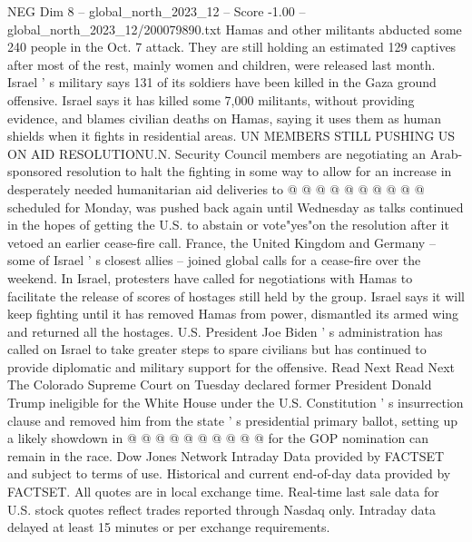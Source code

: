 \begin{textsample}{NEG Dim 8 – global\_north\_2023\_12 – Score -1.00 – global\_north\_2023\_12/200079890.txt}
Hamas and other militants abducted some 240 people in the Oct. 7 attack.
They are still holding an estimated 129 captives after most of the rest, mainly women and children, were released last month.
Israel ' s military says 131 of its soldiers have been killed in the Gaza ground offensive.
Israel says it has killed some 7,000 militants, without providing evidence, and blames civilian deaths on Hamas, saying it uses them as human shields when it fights in residential areas.
UN MEMBERS STILL PUSHING US ON AID RESOLUTIONU.N.
Security Council members are negotiating an Arab-sponsored resolution to halt the fighting in some way to allow for an increase in desperately needed humanitarian aid deliveries to @ @ @ @ @ @ @ @ @ @ scheduled for Monday, was pushed back again until Wednesday as talks continued in the hopes of getting the U.S. to abstain or vote"yes"on the resolution after it vetoed an earlier cease-fire call.
France, the United Kingdom and Germany -- some of Israel ' s closest allies -- joined global calls for a cease-fire over the weekend.
In Israel, protesters have called for negotiations with Hamas to facilitate the release of scores of hostages still held by the group.
Israel says it will keep fighting until it has removed Hamas from power, dismantled its armed wing and returned all the hostages.
U.S.
President Joe Biden ' s administration has called on Israel to take greater steps to spare civilians but has continued to provide diplomatic and military support for the offensive.
Read Next Read Next The Colorado Supreme Court on Tuesday declared former President Donald Trump ineligible for the White House under the U.S.
Constitution ' s insurrection clause and removed him from the state ' s presidential primary ballot, setting up a likely showdown in @ @ @ @ @ @ @ @ @ @ for the GOP nomination can remain in the race.
Dow Jones Network Intraday Data provided by FACTSET and subject to terms of use.
Historical and current end-of-day data provided by FACTSET.
All quotes are in local exchange time.
Real-time last sale data for U.S. stock quotes reflect trades reported through Nasdaq only.
Intraday data delayed at least 15 minutes or per exchange requirements.

\end{textsample}
